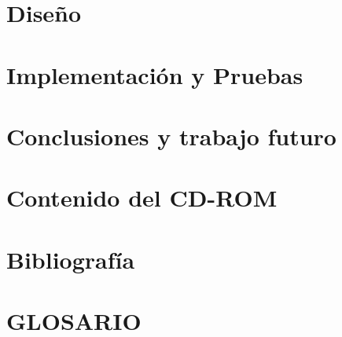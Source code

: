 \documentclass[b5paper,10pt,twoside]{book}
\begin{document}
	
	
	\chapter{Diseño}
	
	
	
	\chapter{Implementación y Pruebas}
	
	
	
	\chapter{Conclusiones y trabajo futuro}
	
	

	\chapter*{Contenido del CD-ROM}
	
	
	
		
	\chapter{Bibliografía}
	\nocite{*}
	

	\chapter*{GLOSARIO}
	
	
\end{document}
